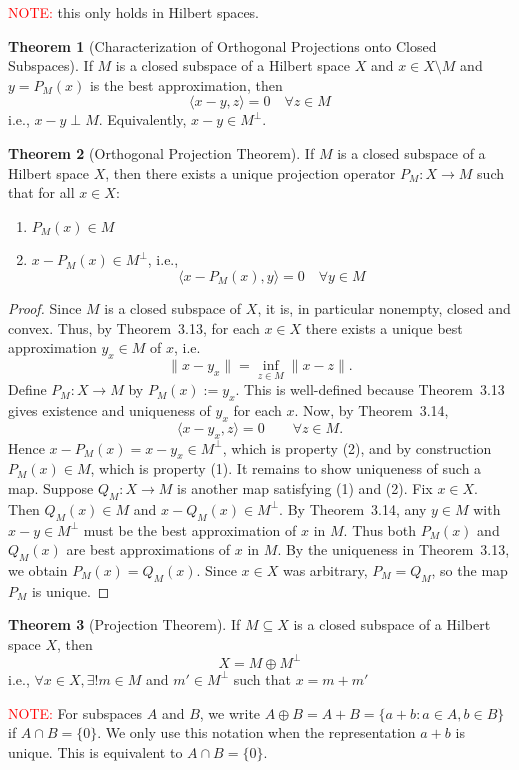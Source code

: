 \documentclass[11pt,a4paper]{article}
\theoremstyle{definition}
\newtheorem{theorem}{Theorem}[section]
\begin{document}
\noindent \textcolor{red}{NOTE:} this only holds in Hilbert spaces.

\begin{theorem}[Characterization of Orthogonal Projections onto Closed Subspaces]
    If $M$ is a closed subspace of a Hilbert space $X$ and $x \in X\setminus M$ and $y = P_M(x)$ is the best approximation, then 
    \[
    \langle x-y, z\rangle = 0 \quad \forall z \in M
    \]       
    i.e., $x-y \perp M$. Equivalently, $x-y \in M^\perp$.
\end{theorem}

\begin{theorem}[Orthogonal Projection Theorem]
If $M$ is a closed subspace of a Hilbert space $X$, then there exists a unique projection operator $P_M: X \to M$ such that for all $x \in X$:
\begin{enumerate}
    \item $P_M(x) \in M$
    \item $x - P_M(x) \in M^\perp$, i.e.,
    \[
    \langle x - P_M(x), y \rangle = 0 \quad \forall y \in M
    \]
\end{enumerate}
\end{theorem}

\begin{proof}
Since $M$ is a closed subspace of $X$, it is, in particular nonempty, closed
and convex. Thus, by Theorem~3.13, for each $x \in X$ there exists a unique
best approximation $y_x \in M$ of $x$, i.e.
\[
  \|x - y_x\| = \inf_{z \in M} \|x - z\|.
\]
Define $P_M : X \to M$ by $P_M(x) := y_x$.
This is well-defined because Theorem~3.13 gives existence and uniqueness of
$y_x$ for each $x$. Now, by Theorem~3.14, 
\[
  \langle x - y_x, z \rangle = 0 \qquad \forall z \in M.
\]
Hence $x - P_M(x) = x - y_x \in M^\perp$, which is property (2), and by
construction $P_M(x) \in M$, which is property (1). It remains to show uniqueness of such a map.
Suppose $Q_M : X \to M$ is another map satisfying (1) and (2).
Fix $x \in X$. Then $Q_M(x) \in M$ and $x - Q_M(x) \in M^\perp$.
By Theorem~3.14, any $y \in M$ with $x - y \in M^\perp$ must be the best
approximation of $x$ in $M$. Thus both $P_M(x)$ and $Q_M(x)$ are best
approximations of $x$ in $M$. By the uniqueness in Theorem~3.13, we obtain
$P_M(x) = Q_M(x)$. Since $x \in X$ was arbitrary, $P_M = Q_M$, so the map
$P_M$ is unique.
\end{proof}


\begin{theorem}[Projection Theorem]
    If $M \subseteq X$ is a closed subspace of a Hilbert space $X$, then 
    \[
    X = M \oplus M^\perp
    \]
    i.e., $\forall x \in X, \exists !m\in M$ and $m' \in M^\perp$ such that $x = m + m'$
\end{theorem}
\noindent \textcolor{red}{NOTE: } For subspaces $A$ and $B$, we write $A \oplus B = A + B = \{a + b:a \in A, b \in B\}$ if $A \cap B = \{0\}$. We only use this notation when the representation $a+b$ is unique. This is equivalent to $A \cap B = \{0\}$.
\end{document}
